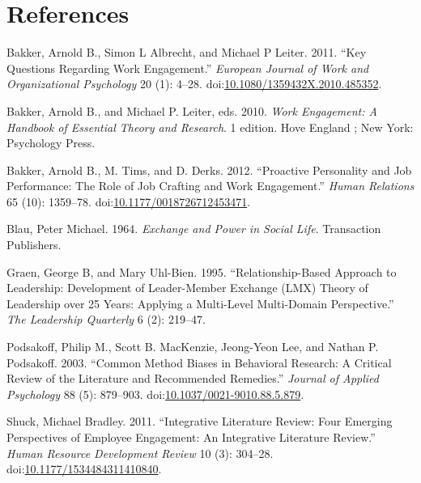 \section*{References}\label{references}

Bakker, Arnold B., Simon L Albrecht, and Michael P Leiter. 2011. ``Key
Questions Regarding Work Engagement.'' \emph{European Journal of Work
and Organizational Psychology} 20 (1): 4--28.
doi:\href{http://dx.doi.org/10.1080/1359432X.2010.485352}{10.1080/1359432X.2010.485352}.

Bakker, Arnold B., and Michael P. Leiter, eds. 2010. \emph{Work
Engagement: A Handbook of Essential Theory and Research}. 1 edition.
Hove England ; New York: Psychology Press.

Bakker, Arnold B., M. Tims, and D. Derks. 2012. ``Proactive Personality
and Job Performance: The Role of Job Crafting and Work Engagement.''
\emph{Human Relations} 65 (10): 1359--78.
doi:\href{http://dx.doi.org/10.1177/0018726712453471}{10.1177/0018726712453471}.

Blau, Peter Michael. 1964. \emph{Exchange and Power in Social Life}.
Transaction Publishers.

Graen, George B, and Mary Uhl-Bien. 1995. ``Relationship-Based Approach
to Leadership: Development of Leader-Member Exchange (LMX) Theory of
Leadership over 25 Years: Applying a Multi-Level Multi-Domain
Perspective.'' \emph{The Leadership Quarterly} 6 (2): 219--47.

Podsakoff, Philip M., Scott B. MacKenzie, Jeong-Yeon Lee, and Nathan P.
Podsakoff. 2003. ``Common Method Biases in Behavioral Research: A
Critical Review of the Literature and Recommended Remedies.''
\emph{Journal of Applied Psychology} 88 (5): 879--903.
doi:\href{http://dx.doi.org/10.1037/0021-9010.88.5.879}{10.1037/0021-9010.88.5.879}.

Shuck, Michael Bradley. 2011. ``Integrative Literature Review: Four
Emerging Perspectives of Employee Engagement: An Integrative Literature
Review.'' \emph{Human Resource Development Review} 10 (3): 304--28.
doi:\href{http://dx.doi.org/10.1177/1534484311410840}{10.1177/1534484311410840}.
